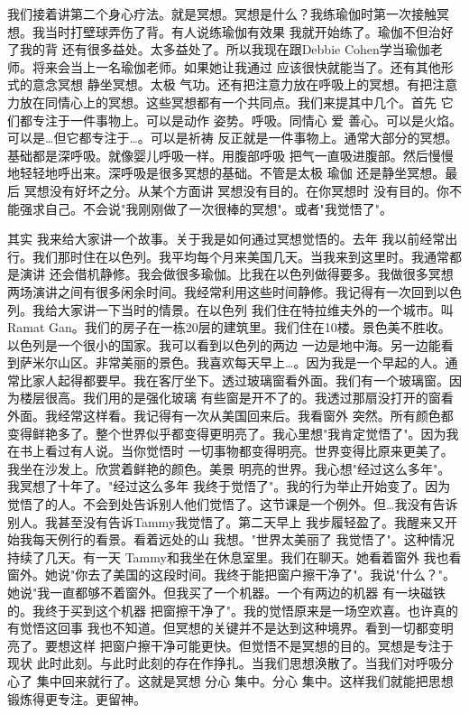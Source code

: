 我们接着讲第二个身心疗法。就是冥想。冥想是什么？我练瑜伽时第一次接触冥想。我当时打壁球弄伤了背。有人说练瑜伽有效果 我就开始练了。瑜伽不但治好了我的背 还有很多益处。太多益处了。所以我现在跟Debbie Cohen学当瑜伽老师。将来会当上一名瑜伽老师。如果她让我通过 应该很快就能当了。还有其他形式的意念冥想 静坐冥想。太极 气功。还有把注意力放在呼吸上的冥想。有把注意力放在同情心上的冥想。这些冥想都有一个共同点。我们来提其中几个。首先 它们都专注于一件事物上。可以是动作 姿势。呼吸。同情心 爱 善心。可以是火焰。可以是…但它都专注于…。可以是祈祷 反正就是一件事物上。通常大部分的冥想。基础都是深呼吸。就像婴儿呼吸一样。用腹部呼吸 把气一直吸进腹部。然后慢慢地轻轻地呼出来。深呼吸是很多冥想的基础。不管是太极 瑜伽 还是静坐冥想。最后 冥想没有好坏之分。从某个方面讲 冥想没有目的。在你冥想时 没有目的。你不能强求自己。不会说"我刚刚做了一次很棒的冥想"。或者"我觉悟了"。 

其实 我来给大家讲一个故事。关于我是如何通过冥想觉悟的。去年 我以前经常出行。我们那时住在以色列。我平均每个月来美国几天。当我来到这里时。我通常都是演讲 还会借机静修。我会做很多瑜伽。比我在以色列做得要多。我做很多冥想 两场演讲之间有很多闲余时间。我经常利用这些时间静修。我记得有一次回到以色列。我给大家讲一下当时的情景。在以色列 我们住在特拉维夫外的一个城市。叫Ramat Gan。我们的房子在一栋20层的建筑里。我们住在10楼。景色美不胜收。以色列是一个很小的国家。我可以看到以色列的两边 一边是地中海。另一边能看到萨米尔山区。非常美丽的景色。我喜欢每天早上…。因为我是一个早起的人。通常比家人起得都要早。我在客厅坐下。透过玻璃窗看外面。我们有一个玻璃窗。因为楼层很高。我们用的是强化玻璃 有些窗是开不了的。我透过那扇没打开的窗看外面。我经常这样看。我记得有一次从美国回来后。我看窗外 突然。所有颜色都变得鲜艳多了。整个世界似乎都变得更明亮了。我心里想"我肯定觉悟了"。因为我在书上看过有人说。当你觉悟时 一切事物都变得明亮。世界变得比原来更美了。我坐在沙发上。欣赏着鲜艳的颜色。美景 明亮的世界。我心想"经过这么多年"。我冥想了十年了。"经过这么多年 我终于觉悟了"。我的行为举止开始变了。因为觉悟了的人。不会到处告诉别人他们觉悟了。这节课是一个例外。但…我没有告诉别人。我甚至没有告诉Tammy我觉悟了。第二天早上 我步履轻盈了。我醒来又开始我每天例行的看景。看着远处的山 我想。"世界太美丽了 我觉悟了"。这种情况持续了几天。有一天 Tammy和我坐在休息室里。我们在聊天。她看着窗外 我也看窗外。她说"你去了美国的这段时间。我终于能把窗户擦干净了"。我说"什么？"。她说"我一直都够不着窗外。但我买了一个机器。一个有两边的机器 有一块磁铁的。我终于买到这个机器 把窗擦干净了"。我的觉悟原来是一场空欢喜。也许真的有觉悟这回事 我也不知道。但冥想的关键并不是达到这种境界。看到一切都变明亮了。要想这样 把窗户擦干净可能更快。但觉悟不是冥想的目的。冥想是专注于现状 此时此刻。与此时此刻的存在作挣扎。当我们思想涣散了。当我们对呼吸分心了 集中回来就行了。这就是冥想 分心 集中。分心 集中。这样我们就能把思想锻炼得更专注。更留神。 

